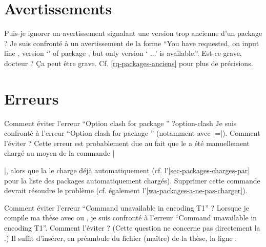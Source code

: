 \section{Avertissements}
\label{sec-avertissements}

\begin{dbfaq}{Puis-je ignorer un avertissement signalant une version trop
    ancienne d'un package ?}{}
  Je suis confronté à un avertissement de la forme \enquote{You have requested,
    on input line , version `' of package
    , but only version ` ...'
    is available.}. Est-ce grave, docteur ?
  \tcblower
  Ça peut être grave. Cf. \vref{rq-packages-anciens} pour plus de précisions.
\end{dbfaq}

\section{Erreurs}
\label{sec-erreurs}%
%
%

\begin{dbfaq}{Comment éviter l'erreur \enquote{Option clash for package
      } ?}{option-clash}
  Je suis confronté à l'erreur \enquote{Option clash for package
    } (notamment avec |=|). Comment
  l'éviter ?
  \tcblower
  Cette erreur est probablement due au fait que le  a été
  manuellement chargé au moyen de la commande
  |\usepackage[...]{|\meta{package}|}|, alors que la \yatCl{} le charge déjà
  automatiquement (cf. l'\vref{sec-packages-charges-par} pour la liste des
  packages automatiquement chargés). Supprimer cette commande devrait résoudre
  le problème (cf. également l'\vref{wa-packages-a-ne-pas-charger}).
\end{dbfaq}

\begin{dbfaq}{Comment éviter l'erreur \enquote{Command
      \protect{} unavailable in encoding T1} ?}{}
  Lorsque je compile ma thèse avec  ou , je
  suis confronté à l'erreur \enquote{Command
     unavailable in encoding T1}. Comment
  l'éviter ?
  \tcblower
  (Cette question ne concerne pas directement la \yatCl{}.) Il suffit d'insérer,
  en préambule du fichier (maître) de la thèse, la
  ligne :
\begin{preamblecode}[title=Par exemple dans le \File{\configurationfile}]
\end{preamblecode}
\end{dbfaq}

